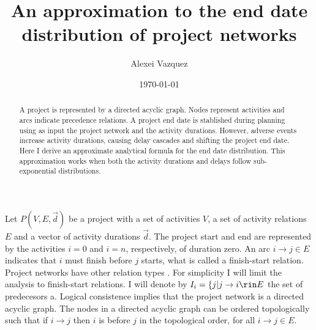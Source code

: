 \documentclass[reprint,aps,prl,amsmath,amssymb,superscriptaddress,showpacs]{revtex4-1}
\begin{document}
\title{An approximation to the end date distribution of project networks}

\author{Alexei Vazquez}


\date{\today}

\begin{abstract}
A project is represented by a directed acyclic graph. Nodes represent activities and arcs indicate precedence relations. A project end date is stablished during planning using as input the project network and the activity durations. However, adverse events increase activity durations, causing delay cascades and shifting the project end date. Here I derive an approximate analytical formula for the end date distribution. This approximation works when both the activity durations and delays follow sub-exponential distributions.   
\end{abstract}

\maketitle



Let $P(V,E,\vec{d})$ be a project with a set of activities $V$, a set of activity relations $E$ and a vector of activity durations $\vec{d}$. The project start and end are represented by the activities $i=0$ and $i=n$, respectively, of duration zero. An arc $i\rightarrow j\in E$ indicates that $i$ must finish before $j$ starts, what is called a finish-start relation. Project networks have other relation types \cite{van13}. For simplicity I will limit the analysis to finish-start relations. I will denote by $I_i=\{j|j\rightarrow i\rin E$ the set of predecesors a. Logical consistence implies that the project network is a directed acyclic graph.  The nodes in a directed acyclic graph can be ordered topologically such that if $i\rightarrow j$ then $i$ is before $j$ in the topological order, for all $i\rightarrow j\in E$.
\end{document}
